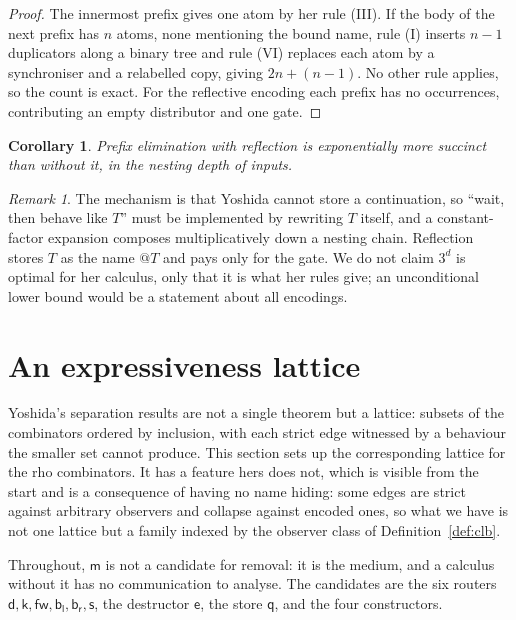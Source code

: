 \documentclass[11pt]{article}
\makeatletter
\theoremstyle{plain}
\newtheorem{corollary}[theorem]{Corollary}
\theoremstyle{definition}
\theoremstyle{remark}
\newtheorem{remark}[theorem]{Remark}
\newcommand{\quo}[1]{@#1}
\newcommand{\mm}{\mathsf{m}}
\newcommand{\dd}{\mathsf{d}}
\newcommand{\kk}{\mathsf{k}}
\newcommand{\fw}{\mathsf{fw}}
\newcommand{\bl}{\mathsf{b}_{\mathsf{l}}}
\newcommand{\br}{\mathsf{b}_{\mathsf{r}}}
\newcommand{\sy}{\mathsf{s}}
\newcommand{\ev}{\mathsf{e}}
\newcommand{\qq}{\mathsf{q}}
\makeatother
\begin{document}
\begin{proof}
The innermost prefix gives one atom by her rule (III). If the body of the
next prefix has $n$ atoms, none mentioning the bound name, rule (I) inserts
$n-1$ duplicators along a binary tree and rule (VI) replaces each atom by a
synchroniser and a relabelled copy, giving $2n + (n-1)$. No other rule
applies, so the count is exact. For the reflective encoding each prefix has
no occurrences, contributing an empty distributor and one gate.
\end{proof}

\begin{corollary}
Prefix elimination with reflection is exponentially more succinct than
without it, in the nesting depth of inputs.
\end{corollary}

\begin{remark}
The mechanism is that Yoshida cannot store a continuation, so ``wait, then
behave like $T$'' must be implemented by rewriting $T$ itself, and a
constant-factor expansion composes multiplicatively down a nesting chain.
Reflection stores $T$ as the name $\quo{T}$ and pays only for the gate. We do
not claim $3^{d}$ is optimal for her calculus, only that it is what her rules
give; an unconditional lower bound would be a statement about all encodings.
\end{remark}

\section{An expressiveness lattice}
\label{sec:lattice}

Yoshida's separation results are not a single theorem but a lattice: subsets
of the combinators ordered by inclusion, with each strict edge witnessed by a
behaviour the smaller set cannot produce. This section sets up the
corresponding lattice for the rho combinators. It has a feature hers does
not, which is visible from the start and is a consequence of having no name
hiding: some edges are strict against arbitrary observers and collapse
against encoded ones, so what we have is not one lattice but a family indexed
by the observer class of Definition~\ref{def:clb}.

Throughout, $\mm$ is not a candidate for removal: it is the medium, and a
calculus without it has no communication to analyse. The candidates are the
six routers $\dd,\kk,\fw,\bl,\br,\sy$, the destructor $\ev$, the store $\qq$,
and the four constructors.
\end{document}

